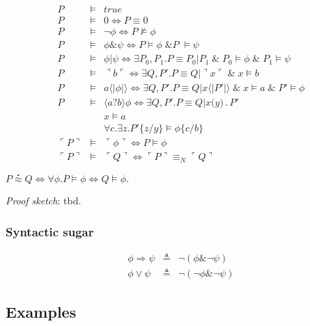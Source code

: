 \documentclass[]{entcs}
\newcommand{\lliftb}{\langle\!|}
\newcommand{\rliftb}{|\!\rangle}
\newcommand{\lpquote}{\ulcorner}
\newcommand{\rpquote}{\urcorner}
\newcommand{\id}[1]{\texttt{#1}}
\newcommand{\pzero}{\mathbin{0}}
\newcommand{\juxtap}{\mathbin{\id{|}}}
\newcommand{\concat}{\mathbin{.}}
\newcommand{\scong}{\mathbin{\equiv}}
\newcommand{\nameeq}{\mathbin{\equiv_N}}
\newcommand{\binpar}[2]{#1 \juxtap #2}
\newcommand{\prefix}[3]{#1 \id{(} #2 \id{)} \concat #3}
\newcommand{\lift}[2]{#1 \lliftb #2 \rliftb}
\newcommand{\quotep}[1]{\lpquote #1 \rpquote}
\newcommand{\dropn}[1]{\rpquote #1 \lpquote}
\newcommand{\substn}[2]{\id{\{} #1 / #2 \id{\}}}
\newcommand{\wbbisim}{\stackrel{\centerdot}{\approx}} %
\newcommand{\ptrue}{\mathbin{true}}
\newcommand{\pdropf}[1]{\rpquote #1 \lpquote}
\newcommand{\plift}[2]{#1 \lliftb #2 \rliftb}
\newcommand{\pprefix}[3]{\langle #1 ? #2 \rangle #3}
\newcommand{\riff}{\Leftrightarrow}
\begin{document}
\begin{eqnarray}
	P & \models & \ptrue \nonumber \\ 
    P & \models & \pzero \riff P \scong \pzero \nonumber \\ 
    P & \models & \neg \phi \riff P \not\models \phi \nonumber\\
    P & \models & \phi \& \psi \riff P \models \phi \; \& P \; \models \psi \nonumber\\
    P & \models & \binpar{\phi}{\psi} \riff \exists P_0, P_1.P \scong \binpar{P_0}{P_1}
      \; \& \; P_0 \models \phi \; \& \;  P_1 \models \psi \nonumber\\
    P & \models & \pdropf{b} \riff \exists Q, P'.P \scong \binpar{Q}{\dropn{x}}
	    \; \& \; x \models b \nonumber\\	
	P & \models & \plift{a}{\phi} \riff \exists Q, P'.P \scong \binpar{Q}{\lift{x}{P'}} 
		\; \& \; x \models a 
		\; \& \; P' \models \phi \nonumber\\
	P & \models & \pprefix{a}{b}{\phi} \riff \exists Q, P'.P \scong \binpar{Q}{\prefix{x}{y}{P'}} \nonumber\\
	  & & x \models a \nonumber\\
	  & & \forall c . \exists z . {P'}\substn{z}{y} \models {\phi}\substn{c}{b} \nonumber\\
    \quotep{P} & \models & \quotep{\phi} \riff P \models \phi \nonumber\\
    \quotep{P} & \models & \quotep{Q} \riff \quotep{P} \nameeq \quotep{Q} \nonumber
\end{eqnarray}

\begin{theorem}[Equivalence]
	$P \wbbisim Q \riff \forall \phi . P \models \phi \riff Q \models \phi .$
\end{theorem}

\emph{Proof sketch}: tbd.

\subsubsection{Syntactic sugar}

\begin{eqnarray}
	\phi \Rightarrow \psi & \triangleq & \neg ( \phi \& \neg \psi ) \nonumber\\
	\phi \vee \psi & \triangleq & \neg ( \neg \phi \& \neg \psi ) \nonumber
\end{eqnarray}

\subsection{Examples}
\end{document}
